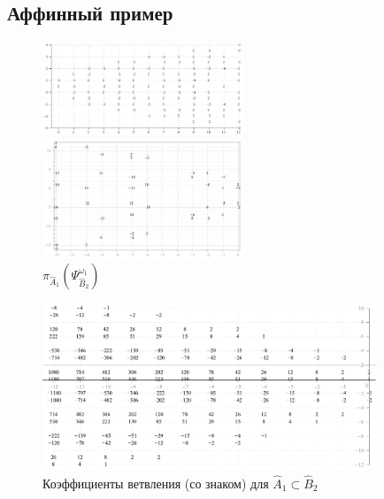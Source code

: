 \documentclass[pdftex]{beamer}
\theoremstyle{definition} \newtheorem{Def}{Определение}
\begin{document}
\subsection{Аффинный пример}
\begin{frame}
  \begin{figure}[t]
    \vspace*{-0.5cm}
    \begin{multicols}{2}
      \hfill
      \includegraphics[width=60mm]{figures/figure10}
      \hfill
      \caption{$\Gamma_{\hat A_1\subset \hat B_2}$}
      \hfill
      \includegraphics[width=60mm]{figures/figure12}
      \caption{ $\pi_{\hat A_{1}}\left( \Psi ^{\omega_1  }_{\hat B_{2}}\right)$}
    \end{multicols}
  \end{figure}
  \begin{figure}[b]
    \vspace*{-1.3cm}
    \centering
      \includegraphics[width=100mm]{figures/figure13}
    \caption{Коэффициенты ветвления (со знаком) для $\hat A_1\subset \hat B_2$}
    \label{fig:2}
  \end{figure}
\end{frame}
\end{document}
